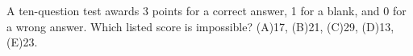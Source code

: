 A ten-question test awards 3 points for a correct answer, 1 for a blank, and 0 for a wrong answer. Which listed score is impossible? (A)17, (B)21, (C)29, (D)13, (E)23.
